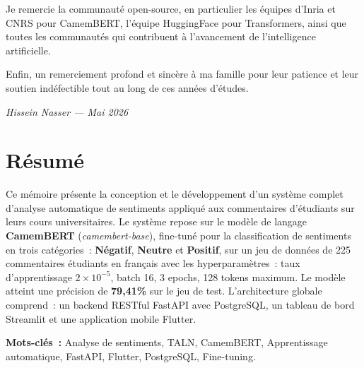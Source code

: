 \documentclass[12pt,a4paper,oneside]{report}
\begin{document}
\vspace{0.5cm}
Je remercie la communauté open-source, en particulier les équipes d'Inria
et CNRS pour CamemBERT, l'équipe HuggingFace pour Transformers, ainsi que
toutes les communautés qui contribuent à l'avancement de l'intelligence artificielle.

\vspace{0.5cm}
Enfin, un remerciement profond et sincère à ma famille pour leur patience
et leur soutien indéfectible tout au long de ces années d'études.

\begin{flushright}\textit{Hissein Nasser --- Mai 2026}\end{flushright}
\cleardoublepage

\chapter*{Résumé}
\begin{tcolorbox}[enhanced,colback=bleuprincipal!5!white,colframe=bleuprincipal,
  boxrule=1.5pt,arc=6pt,left=10pt,right=10pt,top=8pt,bottom=8pt]
Ce mémoire présente la conception et le développement d'un système complet
d'analyse automatique de sentiments appliqué aux commentaires d'étudiants
sur leurs cours universitaires. Le système repose sur le modèle de langage
\textbf{CamemBERT} (\textit{camembert-base}), fine-tuné pour la classification
de sentiments en trois catégories~: \textbf{Négatif}, \textbf{Neutre} et
\textbf{Positif}, sur un jeu de données de 225 commentaires étudiants en
français avec les hyperparamètres~: taux d'apprentissage $2\times10^{-5}$,
batch 16, 3 epochs, 128 tokens maximum. Le modèle atteint une précision de
\textbf{79,41\%} sur le jeu de test. L'architecture globale comprend~:
un backend RESTful FastAPI avec PostgreSQL, un tableau de bord Streamlit
et une application mobile Flutter.
\end{tcolorbox}
\vspace{0.5em}
\noindent\textbf{Mots-clés~:} Analyse de sentiments, TALN, CamemBERT,
Apprentissage automatique, FastAPI, Flutter, PostgreSQL, Fine-tuning.
\cleardoublepage

\end{document}
